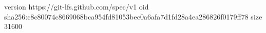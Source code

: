 version https://git-lfs.github.com/spec/v1
oid sha256:c8c80074c8669068bca954fd81053bec0a6afa7d1fd28a4ea286826f0179ff78
size 31600

